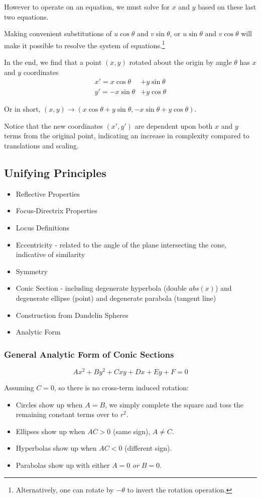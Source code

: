 \documentclass{article}
\begin{document}
However to operate on an equation, we must solve for $x$ and $y$ based on these last two equations.

Making convenient substitutions of $u \cos{\theta}$ and $v \sin{\theta}$, or $u \sin{\theta}$ and $v \cos{\theta}$ will make it possible to resolve the system of equations.\footnote{Alternatively, one can rotate by $-\theta$ to invert the rotation operation.}

In the end, we find that a point $(x,y)$ rotated about the origin by angle $\theta$ has $x$ and $y$ coordinates
\begin{align*}
    x' =  x \cos{\theta} &+ y \sin{\theta} \\
    y' = -x \sin{\theta} &+ y \cos{\theta}
\end{align*}

Or in short, $(x,y) \longrightarrow (x \cos{\theta} + y \sin{\theta}, -x \sin{\theta} + y \cos{\theta})$.

Notice that the new coordinates $(x',y')$ are dependent upon both $x$ and $y$ terms from the original point, indicating an increase in complexity compared to translations and scaling.

\subsection{Unifying Principles}
\begin{itemize}
    \item Reflective Properties
    \item Focus-Directrix Properties
    \item Locus Definitions
    \item Eccentricity - related to the angle of the plane intersecting the cone, indicative of similarity
    \item Symmetry
    \item Conic Section - including degenerate hyperbola (double $abs(x)$) and degenerate ellipse (point) and degenerate parabola (tangent line)
    \item Construction from Dandelin Spheres
    \item Analytic Form
\end{itemize}
\subsubsection{General Analytic Form of Conic Sections}
$$Ax^2 + By^2 + Cxy + Dx + Ey + F = 0$$

Assuming $C = 0$, so there is no cross-term induced rotation:
\begin{itemize}
    \item Circles show up when $A = B$, we simply complete the square and toss the remaining constant terms over to $r^2$.
    \item Ellipses show up when $AC > 0$ (same sign), $A \ne C$.
    \item Hyperbolas show up when $AC < 0$ (different sign).
    \item Parabolas show up with either $A = 0$ \emph{or} $B = 0$.
\end{itemize}
\end{document}
